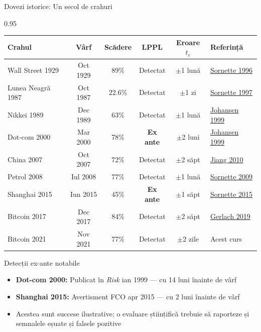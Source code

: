 \documentclass[9pt, aspectratio=169, t]{beamer}
\begin{document}
\begin{frame}{Dovezi istorice: Un secol de crahuri}
    \begin{cminipage}{0.95\textwidth}
    {\scriptsize
    \begin{center}
        \begin{tabular}{lccccl}
            \toprule
            \textbf{Crahul} & \textbf{Vârf} & \textbf{Scădere} & \textbf{LPPL} & \textbf{Eroare $t_c$} & \textbf{Referință} \\
            \midrule
            Wall Street 1929 & Oct 1929 & 89\% & Detectat & $\pm$1 lună & \href{https://doi.org/10.1051/jp1:1996243}{Sornette 1996} \\
            Lunea Neagră 1987 & Oct 1987 & 22.6\% & Detectat & $\pm$1 zi & \href{https://doi.org/10.1016/S0378-4371(97)00318-X}{Sornette 1997} \\
            Nikkei 1989 & Dec 1989 & 63\% & Detectat & $\pm$1 lună & \href{https://doi.org/10.48550/arXiv.cond-mat/9903321}{Johansen 1999} \\
            Dot-com 2000 & Mar 2000 & 78\% & \textbf{Ex ante} & $\pm$2 luni & \href{https://doi.org/10.48550/arXiv.cond-mat/9903321}{Johansen 1999} \\
            China 2007 & Oct 2007 & 72\% & Detectat & $\pm$2 săpt & \href{https://doi.org/10.1016/j.physa.2009.12.022}{Jiang 2010} \\
            Petrol 2008 & Iul 2008 & 77\% & Detectat & $\pm$1 lună & \href{https://doi.org/10.1016/j.physa.2008.12.050}{Sornette 2009} \\
            Shanghai 2015 & Iun 2015 & 45\% & \textbf{Ex ante} & $\pm$1 săpt & \href{https://doi.org/10.1142/S2010139215500044}{Sornette 2015} \\
            Bitcoin 2017 & Dec 2017 & 84\% & Detectat & $\pm$2 săpt & \href{https://doi.org/10.1098/rsos.180643}{Gerlach 2019} \\
            Bitcoin 2021 & Nov 2021 & 77\% & Detectat & $\pm$2 zile & Acest curs \\
            \bottomrule
        \end{tabular}
    \end{center}

    \vspace{2mm}
    \begin{exampleblock}{Detecții ex-ante notabile}
        \begin{itemize}\setlength{\itemsep}{0pt}
            \item \textbf{Dot-com 2000:} Publicat în \textit{Risk} ian 1999 --- cu 14 luni înainte de vârf
            \item \textbf{Shanghai 2015:} Avertisment FCO apr 2015 --- cu 2 luni înainte de vârf
            \item Acestea sunt succese ilustrative; o evaluare științifică trebuie să raporteze și semnalele eșuate și falsele pozitive
        \end{itemize}
    \end{exampleblock}
    }
    \end{cminipage}
\end{frame}
\end{document}
